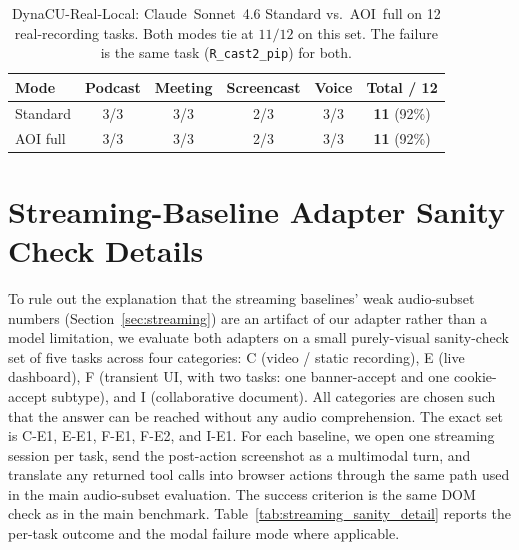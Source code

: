 \documentclass[11pt]{article}
\begin{document}
\begin{table}[t]
\centering
\caption{DynaCU-Real-Local: Claude~Sonnet~4.6 Standard vs.\ AOI~full on 12
real-recording tasks.  Both modes tie at $11/12$ on this set. The failure
is the same task (\texttt{R\_cast2\_pip}) for both.}
\label{tab:realcontent}
\small
\begin{tabular}{@{}l cccc c@{}}
\toprule
\textbf{Mode} & \textbf{Podcast} & \textbf{Meeting} & \textbf{Screencast} & \textbf{Voice} & \textbf{Total / 12} \\
\midrule
Standard      & 3/3 & 3/3 & 2/3 & 3/3 & \textbf{11} \scriptsize(92\%) \\
AOI full      & 3/3 & 3/3 & 2/3 & 3/3 & \textbf{11} \scriptsize(92\%) \\
\bottomrule
\end{tabular}
\end{table}

\section{Streaming-Baseline Adapter Sanity Check Details}
\label{app:streaming_sanity}

To rule out the explanation that the streaming baselines' weak
audio-subset numbers (Section~\ref{sec:streaming}) are an artifact of our
adapter rather than a model limitation, we evaluate both adapters on a
small purely-visual sanity-check set of five tasks across four categories: C
(video / static recording), E (live dashboard), F (transient UI, with two
tasks: one banner-accept and one cookie-accept subtype), and I
(collaborative document).
All categories are chosen such that the answer can be reached without any audio comprehension.
The exact set is C-E1, E-E1, F-E1, F-E2, and I-E1.
For each baseline, we open one streaming session per task, send the
post-action screenshot as a multimodal turn, and translate any returned
tool calls into browser actions through the same path used in the main
audio-subset evaluation.
The success criterion is the same DOM check as in the main benchmark.
Table~\ref{tab:streaming_sanity_detail} reports the per-task outcome and
the modal failure mode where applicable.
\end{document}
